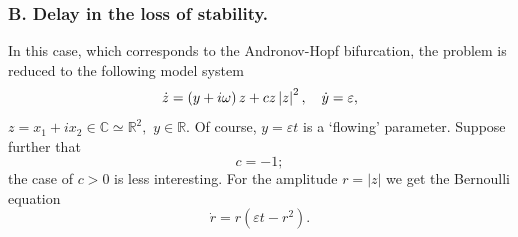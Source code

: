 \subsubsection{B. Delay in the loss of stability.}
In this case, which corresponds to the Andronov-Hopf bifurcation, the problem is reduced to the following model system
\begin{equation}
\label{4.13}
\dot{z}=\left( y+i\omega \right) z+cz\left\vert z\right\vert ^{2},\text{ \ \
}\dot{y}=\varepsilon ,
\end{equation}
$z = x_{1}+ix_{2}\in \mathbb{C}\simeq \mathbb{R}^{2},$ $y\in \mathbb{R}.$ Of course, $y=\varepsilon t$ is a `flowing' parameter. Suppose further that
$$
c=-1;
$$
the case of $c> 0$ is less interesting. For the amplitude $r=\left\vert z\right\vert$ we get the Bernoulli equation
$$
\dot{r}=r\left( \varepsilon t-r^{2}\right).
$$

